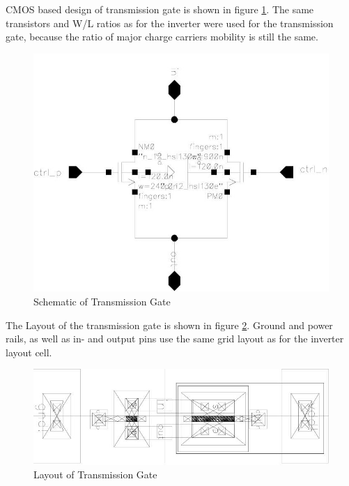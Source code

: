 \documentclass[parskip,oneside,colorbacktitle,10pt,accentcolor=tud1b,table]{tudreport}
\begin{document}
{\begin{minipage}[t]{0.40\textwidth}
CMOS based design of transmission gate is shown in figure \ref{fig:txgate_schematic}. The same transistors and W/L ratios as for the inverter were used for the transmission gate, because the ratio of major charge carriers mobility is still the same. 
\end{minipage}
\begin{minipage}[t]{0.55\textwidth}
	\begin{figure}[H]
		\begin{center}
	        \includegraphics[scale=0.3]{Transmission_gate_schematic}
			\caption{Schematic of Transmission Gate}
            \label{fig:txgate_schematic}
		\end{center}			
	\end{figure}
\end{minipage}

The Layout of the transmission gate is shown in figure \ref{fig:txgate_layout}. Ground and power rails, as well as in- and output pins use the same grid layout as for the inverter layout cell.

\begin{figure}[H]
     \begin{center}
        \includegraphics[scale=0.35]{Transmission_gate_layout2}
        \caption{Layout of Transmission Gate}
        \label{fig:txgate_layout}
    \end{center}
\end{figure}

}
\end{document}
